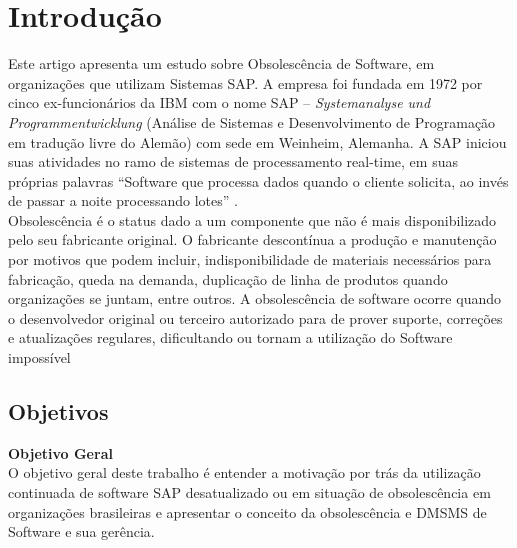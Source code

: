 \section{\esp Introdução}

Este artigo apresenta um estudo sobre Obsolescência de Software, em organizações que utilizam Sistemas SAP. A empresa foi fundada em 1972 por cinco ex-funcionários da IBM com o nome SAP – \textit{Systemanalyse und Programmentwicklung} (Análise de Sistemas e Desenvolvimento de Programação em tradução livre do Alemão) com sede em Weinheim, Alemanha. A SAP iniciou suas atividades no ramo de sistemas de processamento real-time, em suas próprias palavras “Software que processa dados quando o cliente solicita, ao invés de passar a noite processando lotes” \cite{sapse}.
\\

Obsolescência é o status dado a um componente que não é mais disponibilizado pelo seu fabricante original. O fabricante descontínua a produção e manutenção por motivos que podem incluir, indisponibilidade de materiais necessários para fabricação, queda na demanda, duplicação de linha de produtos quando organizações se juntam, entre outros. 
A obsolescência de software ocorre quando o desenvolvedor original ou terceiro autorizado para de prover suporte, correções e atualizações regulares, dificultando ou tornam a utilização do Software impossível \cite{rajagopala}

\subsection{\esp Objetivos}

\textbf{Objetivo Geral}\\O objetivo geral deste trabalho é entender a motivação por trás da utilização continuada de software SAP desatualizado ou em situação de obsolescência em organizações brasileiras e apresentar o conceito da obsolescência e DMSMS de Software e sua gerência.


